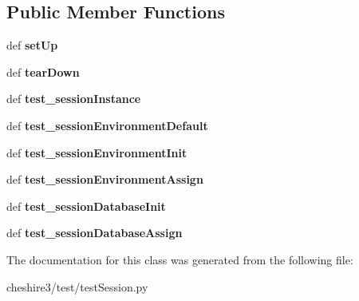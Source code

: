 \subsection*{Public Member Functions}
\begin{DoxyCompactItemize}
\item 
\hypertarget{classcheshire3_1_1test_1_1test_session_1_1_cheshire3_session_test_case_a39bacf2b861e12c824eb7fc1f142935a}{def {\bfseries set\-Up}}\label{classcheshire3_1_1test_1_1test_session_1_1_cheshire3_session_test_case_a39bacf2b861e12c824eb7fc1f142935a}

\item 
\hypertarget{classcheshire3_1_1test_1_1test_session_1_1_cheshire3_session_test_case_acdedcd13b98a299acd505b28b6a4a21b}{def {\bfseries tear\-Down}}\label{classcheshire3_1_1test_1_1test_session_1_1_cheshire3_session_test_case_acdedcd13b98a299acd505b28b6a4a21b}

\item 
\hypertarget{classcheshire3_1_1test_1_1test_session_1_1_cheshire3_session_test_case_a9388a71499201885840610141be761c7}{def {\bfseries test\-\_\-session\-Instance}}\label{classcheshire3_1_1test_1_1test_session_1_1_cheshire3_session_test_case_a9388a71499201885840610141be761c7}

\item 
\hypertarget{classcheshire3_1_1test_1_1test_session_1_1_cheshire3_session_test_case_aff52e324d00ff15b4d6d249a023752eb}{def {\bfseries test\-\_\-session\-Environment\-Default}}\label{classcheshire3_1_1test_1_1test_session_1_1_cheshire3_session_test_case_aff52e324d00ff15b4d6d249a023752eb}

\item 
\hypertarget{classcheshire3_1_1test_1_1test_session_1_1_cheshire3_session_test_case_ab8687a3301b0673ea326ad59e2f81e55}{def {\bfseries test\-\_\-session\-Environment\-Init}}\label{classcheshire3_1_1test_1_1test_session_1_1_cheshire3_session_test_case_ab8687a3301b0673ea326ad59e2f81e55}

\item 
\hypertarget{classcheshire3_1_1test_1_1test_session_1_1_cheshire3_session_test_case_a14adda0d3b8d27d0be377aeb67ee856c}{def {\bfseries test\-\_\-session\-Environment\-Assign}}\label{classcheshire3_1_1test_1_1test_session_1_1_cheshire3_session_test_case_a14adda0d3b8d27d0be377aeb67ee856c}

\item 
\hypertarget{classcheshire3_1_1test_1_1test_session_1_1_cheshire3_session_test_case_a62edca045b595cd75ed4341a9614bf92}{def {\bfseries test\-\_\-session\-Database\-Init}}\label{classcheshire3_1_1test_1_1test_session_1_1_cheshire3_session_test_case_a62edca045b595cd75ed4341a9614bf92}

\item 
\hypertarget{classcheshire3_1_1test_1_1test_session_1_1_cheshire3_session_test_case_acc96af7db0ce6e0297210b932c1161f0}{def {\bfseries test\-\_\-session\-Database\-Assign}}\label{classcheshire3_1_1test_1_1test_session_1_1_cheshire3_session_test_case_acc96af7db0ce6e0297210b932c1161f0}

\end{DoxyCompactItemize}


The documentation for this class was generated from the following file\-:\begin{DoxyCompactItemize}
\item 
cheshire3/test/test\-Session.\-py\end{DoxyCompactItemize}
